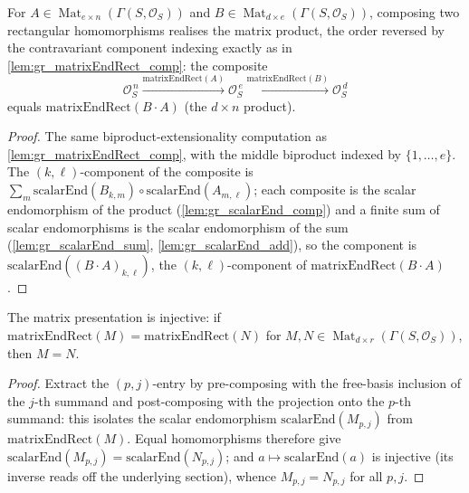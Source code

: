 \begin{lemma}
  \label{lem:gr_matrixEndRect_comp_rect}
  For \(A \in \operatorname{Mat}_{e\times n}(\Gamma(S,\mathcal{O}_S))\) and
  \(B \in \operatorname{Mat}_{d\times e}(\Gamma(S,\mathcal{O}_S))\), composing two
  rectangular homomorphisms realises the matrix product, the order reversed by the
  contravariant component indexing exactly as in \cref{lem:gr_matrixEndRect_comp}: the
  composite
  \[
    \mathcal{O}_S^{\,n} \xrightarrow{\mathrm{matrixEndRect}(A)} \mathcal{O}_S^{\,e}
      \xrightarrow{\mathrm{matrixEndRect}(B)} \mathcal{O}_S^{\,d}
  \]
  equals \(\mathrm{matrixEndRect}(B \cdot A)\) (the \(d \times n\) product).
\end{lemma}
\begin{proof}
  The same biproduct-extensionality computation as \cref{lem:gr_matrixEndRect_comp}, with the
  middle biproduct indexed by \(\{1,\dots,e\}\). The \((k,\ell)\)-component of the composite
  is \(\sum_m \mathrm{scalarEnd}(B_{k,m})\circ\mathrm{scalarEnd}(A_{m,\ell})\); each composite
  is the scalar endomorphism of the product (\cref{lem:gr_scalarEnd_comp}) and a finite sum
  of scalar endomorphisms is the scalar endomorphism of the sum (\cref{lem:gr_scalarEnd_sum},
  \cref{lem:gr_scalarEnd_add}), so the component is
  \(\mathrm{scalarEnd}((B\cdot A)_{k,\ell})\), the \((k,\ell)\)-component of
  \(\mathrm{matrixEndRect}(B\cdot A)\).
\end{proof}

\begin{lemma}
  \label{lem:gr_matrixEndRect_injective}
  The matrix presentation is injective: if
  \(\mathrm{matrixEndRect}(M) = \mathrm{matrixEndRect}(N)\) for
  \(M, N \in \operatorname{Mat}_{d\times r}(\Gamma(S,\mathcal{O}_S))\), then \(M = N\).
\end{lemma}
\begin{proof}
  Extract the \((p,j)\)-entry by pre-composing with the free-basis inclusion of the
  \(j\)-th summand and post-composing with the projection onto the \(p\)-th summand: this
  isolates the scalar endomorphism \(\mathrm{scalarEnd}(M_{p,j})\) from
  \(\mathrm{matrixEndRect}(M)\). Equal homomorphisms therefore give
  \(\mathrm{scalarEnd}(M_{p,j}) = \mathrm{scalarEnd}(N_{p,j})\); and \(a \mapsto
  \mathrm{scalarEnd}(a)\) is injective (its inverse reads off the underlying section), whence
  \(M_{p,j} = N_{p,j}\) for all \(p, j\).
\end{proof}

